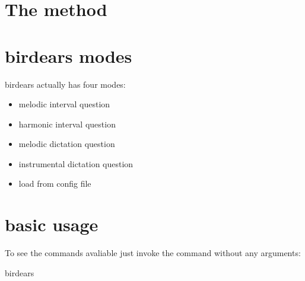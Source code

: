 \documentclass[letterpaper,10pt,english]{sphinxmanual}
\begin{document}
\section{The method}
\label{\detokenize{using:the-method}}


\section{birdears modes}
\label{\detokenize{using:birdears-modes}}
birdears actually has four modes:
\begin{itemize}
\item {} 
melodic interval question

\item {} 
harmonic interval question

\item {} 
melodic dictation question

\item {} 
instrumental dictation question

\item {} 
load from config file

\end{itemize}


\section{basic usage}
\label{\detokenize{using:basic-usage}}
To see the commands avaliable just invoke the command without any arguments:

\begin{sphinxVerbatim}[commandchars=\\\{\}]
birdears
\end{sphinxVerbatim}
\end{document}
